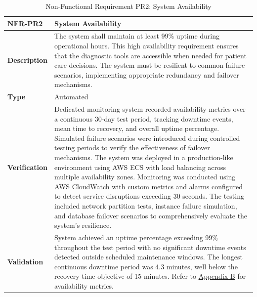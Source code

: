 \documentclass[12pt, titlepage]{article}
\begin{document}
\begin{table}[H]
\centering
{}
\begin{tabular}{|p{3.5cm}|p{11.5cm}|}
\hline
\rowcolor{gray!30}
\textbf{NFR-PR2} & \textbf{System Availability} \\
\hline
\textbf{Description} & The system shall maintain at least 99\% uptime during operational hours. This high availability requirement ensures that the diagnostic tools are accessible when needed for patient care decisions. The system must be resilient to common failure scenarios, implementing appropriate redundancy and failover mechanisms. \\
\hline
\textbf{Type} & Automated \\
\hline
\textbf{Verification} & Dedicated monitoring system recorded availability metrics over a continuous 30-day test period, tracking downtime events, mean time to recovery, and overall uptime percentage. Simulated failure scenarios were introduced during controlled testing periods to verify the effectiveness of failover mechanisms. The system was deployed in a production-like environment using AWS ECS with load balancing across multiple availability zones. Monitoring was conducted using AWS CloudWatch with custom metrics and alarms configured to detect service disruptions exceeding 30 seconds. The testing included network partition tests, instance failure simulation, and database failover scenarios to comprehensively evaluate the system's resilience. \\
\hline
\textbf{Validation} & System achieved an uptime percentage exceeding 99\% throughout the test period with no significant downtime events detected outside scheduled maintenance windows. The longest continuous downtime period was 4.3 minutes, well below the recovery time objective of 15 minutes. Refer to \hyperref[appendix:B]{Appendix B} for availability metrics. \\
\hline
\end{tabular}
\caption{Non-Functional Requirement PR2: System Availability}
\end{table}
\end{document}
